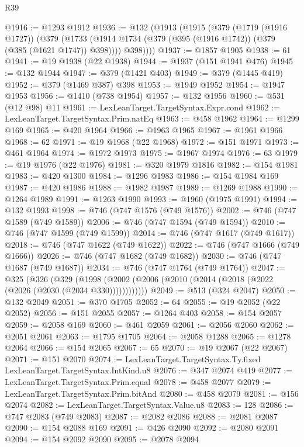 \begin{lexlean}{R39}
\begin{coremodule}
@1916 := @1293 @1912
@1936 := @132
    (@1913
      (@1915
        (@379
          (@1719 (@1916 @1727))
          (@379
            (@1733 (@1914 @1734 (@379 (@395 (@1916 @1742)) (@379 (@385 (@1621 @1747)) @398))))
            @398))))
@1937 := @1857 @1905
@1938 := 61
@1941 := @19 @1938 (@22 @1938)
@1944 := @1937 (@151 @1941 @476)
@1945 := @132 @1944
@1947 := @379 (@1421 @403)
@1949 := @379 (@1445 @419)
@1952 := @379 (@1469 @387) @398
@1953 := @1949 @1952
@1954 := @1947 @1953
@1956 := @1410 (@738 @1954)
@1957 := @132 @1956
@1960 := @531 (@12 @98) @11
@1961 := LexLeanTarget.TargetSyntax.Expr.cond
@1962 := LexLeanTarget.TargetSyntax.Prim.natEq
@1963 := @458 @1962
@1964 := @1299 @169
@1965 := @420 @1964
@1966 := @1963 @1965
@1967 := @1961 @1966
@1968 := 62
@1971 := @19 @1968 (@22 @1968)
@1972 := @151 @1971
@1973 := @461 @1964
@1974 := @1972 @1973
@1975 := @1967 @1974
@1976 := 63
@1979 := @19 @1976 (@22 @1976)
@1981 := @320 @1979 @1816
@1982 := @154 @1981
@1983 := @420 @1300
@1984 := @1296 @1983
@1986 := @154 @1984 @169
@1987 := @420 @1986
@1988 := @1982 @1987
@1989 := @1269 @1988
@1990 := @1264 @1989
@1991 := @1263 @1990
@1993 := @1960 (@1975 @1991)
@1994 := @132 @1993
@1998 := @746 (@747 @1576 (@749 @1576))
@2002 := @746 (@747 @1589 (@749 @1589))
@2006 := @746 (@747 @1594 (@749 @1594))
@2010 := @746 (@747 @1599 (@749 @1599))
@2014 := @746 (@747 @1617 (@749 @1617))
@2018 := @746 (@747 @1622 (@749 @1622))
@2022 := @746 (@747 @1666 (@749 @1666))
@2026 := @746 (@747 @1682 (@749 @1682))
@2030 := @746 (@747 @1687 (@749 @1687))
@2034 := @746 (@747 @1764 (@749 @1764))
@2047 := @325
    (@326
      (@329 (@1998 (@2002 (@2006 (@2010 (@2014 (@2018 (@2022 (@2026 (@2030 (@2034 @330))))))))))))
@2049 := @513 (@324 @2047)
@2050 := @132 @2049
@2051 := @370 @1705
@2052 := 64
@2055 := @19 @2052 (@22 @2052)
@2056 := @151 @2055
@2057 := @1264 @403
@2058 := @154 @2057
@2059 := @2058 @169
@2060 := @461 @2059
@2061 := @2056 @2060
@2062 := @2051 @2061
@2063 := @1795 @1705
@2064 := @2058 @1288
@2065 := @1278 @2064
@2066 := @154 @2065
@2067 := 65
@2070 := @19 @2067 (@22 @2067)
@2071 := @151 @2070
@2074 := LexLeanTarget.TargetSyntax.Ty.fixed LexLeanTarget.TargetSyntax.IntKind.u8
@2076 := @347 @2074 @419
@2077 := LexLeanTarget.TargetSyntax.Prim.equal
@2078 := @458 @2077
@2079 := LexLeanTarget.TargetSyntax.Prim.bitAnd
@2080 := @458 @2079
@2081 := @156 @2074
@2082 := LexLeanTarget.TargetSyntax.Value.u8
@2083 := 128
@2086 := @747 @2083 (@749 @2083)
@2087 := @2082 @2086
@2088 := @2081 @2087
@2090 := @154 @2088 @169
@2091 := @426 @2090
@2092 := @2080 @2091
@2094 := @154 @2092 @2090
@2095 := @2078 @2094

\end{coremodule}
\end{lexlean}
